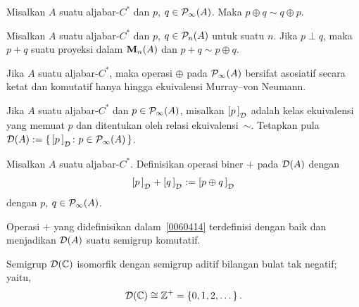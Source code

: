 \begin{prop}\label{0060331} Misalkan $A$ suatu aljabar-$C^*$ dan $p$, $q \in \mathcal{P}_\infty(A)$.
Maka $p \oplus q \sim q \oplus p$.
\end{prop}

\begin{prop}\label{0060334} Misalkan $A$ suatu aljabar-$C^*$ dan $p$, $q \in \mathcal{P}_n(A)$ untuk
suatu $n$. Jika $p \perp q$, maka $p + q$ suatu proyeksi dalam $\mathbf{M}_{n}({A})$ dan $p + q \sim p \oplus q$.
\end{prop}

\begin{prop}\label{0060337} Jika $A$ suatu aljabar-$C^*$, maka operasi $\oplus$ pada $\mathcal{P}_\infty(A)$ bersifat
asosiatif secara ketat dan komutatif hanya hingga ekuivalensi Murray--von Neumann. %
\end{prop}

\begin{notn}\label{0060411} Jika $A$ suatu aljabar-$C^*$ dan $p \in \mathcal{P}_\infty(A)$, misalkan
$[p\,]_{{}_{\scriptstyle{\mathcal{D}}}}$ adalah kelas ekuivalensi yang memuat $p$ dan ditentukan oleh
relasi ekuivalensi~$\sim$. Tetapkan pula
$\mathcal{D}(A) := \{\,[p\,]_{{}_{\scriptstyle{\mathcal{D}}}}\colon p \in \mathcal{P}_\infty(A)\,\}$.
\end{notn}

\begin{defn}\label{0060414} Misalkan $A$ suatu aljabar-$C^*$. Definisikan operasi biner $+$ pada
$\mathcal{D}(A)$ dengan
   \[ [p\,]_{{}_{\scriptstyle{\mathcal{D}}}} + [q\,]_{{}_{\scriptstyle{\mathcal{D}}}} := [p \oplus q\,]_{{}_{\scriptstyle{\mathcal{D}}}} \]
dengan $p$, $q \in \mathcal{P}_\infty(A)$.
\end{defn}

\begin{prop}\label{0060417} Operasi $+$ yang didefinisikan dalam~\ref{0060414} terdefinisi dengan baik
dan menjadikan $\mathcal{D}(A)$ suatu semigrup komutatif.
\end{prop}

\begin{exam}\label{0060421} Semigrup $\mathcal{D}(\mathbb{C})$ isomorfik dengan semigrup aditif bilangan bulat tak negatif; yaitu, %
    \[ \mathcal{D}(\mathbb{C}) \cong \mathbb{Z}^+ = \{0,1,2,\dots\}\,.  \]
\end{exam}

